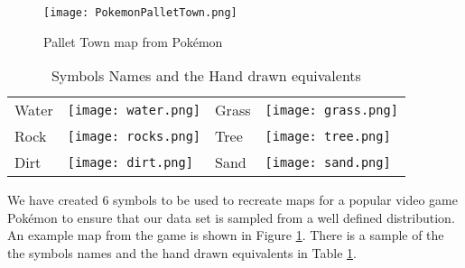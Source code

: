 \begin{figure}[h]
\begin{center}
\texttt{[image: PokemonPalletTown.png]}
\end{center}
\caption{Pallet Town map from Pok\'{e}mon\cite{firered}} 
\label{fig:pokemon}
\end{figure}

\begin{table}
\label{table:symbols}
\caption{Symbols Names and the Hand drawn equivalents}
\begin{center}
\begin{tabular}{llll}
Water & \texttt{[image: water.png]} &
Grass & \texttt{[image: grass.png]} \\
Rock & \texttt{[image: rocks.png]} &
Tree & \texttt{[image: tree.png]} \\
Dirt & \texttt{[image: dirt.png]} &
Sand & \texttt{[image: sand.png]} \\
\end{tabular}
\end{center}
\end{table}

We have created 6 symbols to be used to recreate maps for a popular video game
Pok\'{e}mon to ensure that our data set is sampled from a well defined distribution.
An example map from the game is shown in Figure \ref{fig:pokemon}. There is a sample
of the the symbols names and the hand drawn equivalents in Table \ref{table:symbols}.



